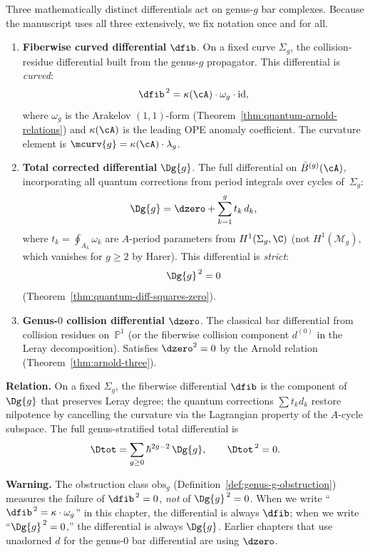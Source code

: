 \begin{convention}\label{conv:higher-genus-differentials}
Three mathematically distinct differentials act on genus-$g$ bar complexes.
Because the manuscript uses all three extensively, we fix notation once and
for all.
\begin{enumerate}
\item[\textup{(i)}] \textbf{Fiberwise curved differential} $\dfib$.
  On a fixed curve $\Sigma_g$, the collision-residue differential built
  from the genus-$g$ propagator.  This differential is \emph{curved}:
  \[
    \dfib^{\,2} = \kappa(\cA)\cdot\omega_g\cdot\mathrm{id},
  \]
  where $\omega_g$ is the Arakelov $(1,1)$-form
  (Theorem~\ref{thm:quantum-arnold-relations}) and
  $\kappa(\cA)$ is the leading OPE anomaly coefficient.
  The curvature element is $\mcurv{g} = \kappa(\cA)\cdot\lambda_g$.

\item[\textup{(ii)}] \textbf{Total corrected differential} $\Dg{g}$.
  The full differential on $\bar{B}^{(g)}(\cA)$, incorporating all
  quantum corrections from period integrals over cycles of~$\Sigma_g$:
  \[
    \Dg{g} = \dzero + \sum_{k=1}^{g} t_k\, d_k,
  \]
  where $t_k = \oint_{A_k}\omega_k$ are $A$-period parameters from
  $H^1(\Sigma_g,\C)$ \textup{(}not $H^1(\mathcal{M}_g)$, which
  vanishes for $g\ge 2$ by Harer\textup{)}.  This differential is
  \emph{strict}:
  \[
    \Dg{g}^{\,2} = 0
  \]
  \textup{(}Theorem~\textup{\ref{thm:quantum-diff-squares-zero})}.

\item[\textup{(iii)}] \textbf{Genus-$0$ collision differential} $\dzero$.
  The classical bar differential from collision residues on~$\mathbb{P}^1$
  (or the fiberwise collision component $d^{(0)}$ in the Leray
  decomposition).  Satisfies $\dzero^2 = 0$ by the Arnold relation
  (Theorem~\ref{thm:arnold-three}).
\end{enumerate}

\noindent
\textbf{Relation.}
On a fixed $\Sigma_g$, the fiberwise differential $\dfib$ is
the component of $\Dg{g}$ that preserves Leray degree; the
quantum corrections $\sum t_k d_k$ restore nilpotence by
cancelling the curvature via the Lagrangian property of the
$A$-cycle subspace.  The full genus-stratified total differential is
\[
  \Dtot = \sum_{g\ge 0} \hbar^{2g-2}\,\Dg{g}, \qquad
  \Dtot^{\,2} = 0.
\]

\noindent
\textbf{Warning.}
The obstruction class $\mathrm{obs}_g$ (Definition~\ref{def:genus-g-obstruction})
measures the failure of $\dfib^{\,2} = 0$, \emph{not} of $\Dg{g}^{\,2} = 0$.
When we write ``$\dfib^{\,2} = \kappa\cdot\omega_g$'' in this chapter, the
differential is always $\dfib$; when we write ``$\Dg{g}^{\,2} = 0$,'' the
differential is always $\Dg{g}$.  Earlier chapters that use unadorned
$d$ for the genus-$0$ bar differential are using $\dzero$.
\end{convention}

